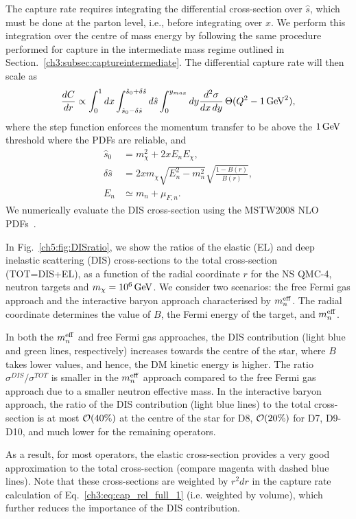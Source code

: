 The capture rate requires integrating the differential cross-section over $\hat{s}$, which must be done at the parton level, i.e., before integrating over $x$. We perform this integration over the centre of mass energy by following the same procedure performed for capture in the intermediate mass regime outlined in Section.~\ref{ch3:subsec:captureintermediate}. The differential capture rate will then scale as 
\begin{align}
   \frac{dC}{dr}\propto \int_0^1 dx\int_{\hat{s}_0-\delta\hat{s}}^{\hat{s}_0+\delta\hat{s}}d\hat{s}\int_0^{y_{max}}dy  \frac{d^2\sigma}{dx\, dy} \,\Theta(Q^2 -1{\rm \,GeV}^2), \label{eq:DIS}
\end{align}
where the step function enforces the momentum transfer to be above the $1{\rm \,GeV}$ threshold where the PDFs are reliable, and 
\begin{align}
    \hat{s}_0 & = m_\chi^2 + 2x E_n E_\chi,\\
    \delta\hat{s} & = 2xm_\chi \sqrt{E_n^2 -m_n^2}\sqrt{\frac{1-B(r)}{B(r)}},\\
    E_n & \simeq m_n + \mu_{F,n}. 
\end{align}
We numerically evaluate the DIS cross-section using the MSTW2008 NLO PDFs~\cite{Martin:2009iq_PartondistributionsLHC}. 

In Fig.~\ref{ch5:fig:DISratio}, we show the ratios of the elastic (EL) and deep inelastic scattering (DIS) cross-sections
to the total cross-section (TOT=DIS+EL),  as a function of the radial coordinate $r$ for the NS  QMC-4, neutron targets and $m_\chi=10^6{\rm \,GeV}$. We consider two scenarios: the free Fermi gas approach and the interactive baryon approach characterised by $m_n^{\rm eff}$. The radial coordinate determines the value of $B$, the Fermi energy of the target, and $m_n^{\rm eff}$. 

In both the $m_n^{\rm eff}$ and free Fermi gas approaches, the DIS contribution (light blue and green lines, respectively) increases towards the centre of the star, where $B$ takes lower values, and hence, the DM kinetic energy is higher. The ratio $\sigma^{DIS}/\sigma^{TOT}$ is smaller in the $m_n^{\rm eff}$ approach compared to the free Fermi gas approach due to a smaller neutron effective mass. In the interactive baryon approach, the ratio of the DIS contribution (light blue lines) to the total cross-section is at most ${\cal O}(40\%)$ at the centre of the star for D8, ${\cal O}(20\%)$ for D7, D9-D10, and much lower for the remaining operators.  

As a result, for most operators, the elastic cross-section provides a very good approximation to the total cross-section (compare magenta with dashed blue lines).
Note that these cross-sections are weighted by $r^2dr$ in the capture rate calculation of Eq.~\ref{ch3:eq:cap_rel_full_1} (i.e. weighted by volume), which further reduces the importance of the DIS contribution. 

